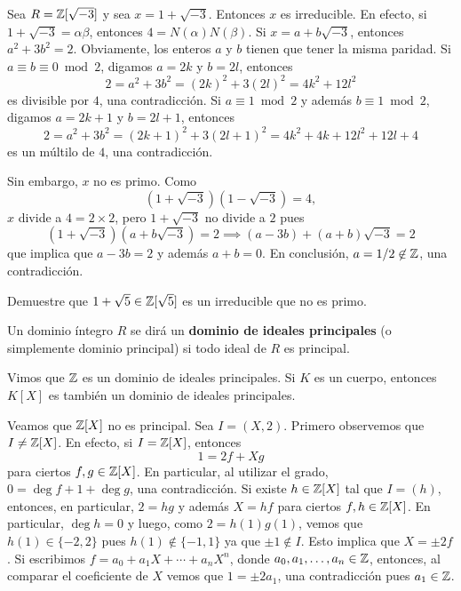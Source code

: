 \begin{example}
Sea $R=\mathbb{Z}[\sqrt{-3}]$ y sea $x=1+\sqrt{-3}$. Entonces $x$ es irreducible. En efecto,
si $1+\sqrt{-3}=\alpha\beta$, entonces $4=N(\alpha)N(\beta)$. Si $x=a+b\sqrt{-3}$, entonces
$a^2+3b^2=2$. Obviamente, los enteros $a$ y $b$ tienen que tener la misma paridad. 
Si $a\equiv b\equiv 0\bmod 2$, digamos $a=2k$ y $b=2l$, entonces
\[
2=a^2+3b^2=(2k)^2+3(2l)^2=4k^2+12l^2
\]
es divisible por $4$, una contradicción. Si $a\equiv 1\bmod 2$ y además $b\equiv 1\bmod 2$, digamos
$a=2k+1$ y $b=2l+1$, entonces
\[
2=a^2+3b^2=(2k+1)^2+3(2l+1)^2=4k^2+4k+12l^2+12l+4
\]
es un múltilo de $4$, una contradicción. 

Sin embargo, $x$ no es primo. Como
\[
(1+\sqrt{-3})(1-\sqrt{-3})=4,
\]
$x$ divide a $4=2\times 2$, pero $1+\sqrt{-3}$ no divide a $2$ pues 
\[
(1+\sqrt{-3})(a+b\sqrt{-3})=2\implies
(a-3b)+(a+b)\sqrt{-3}=2
\]
que implica que $a-3b=2$ y además $a+b=0$. En conclusión, $a=1/2\not\in\mathbb{Z}$, una contradicción. 
\end{example}

\begin{exercise}
Demuestre que $1+\sqrt{5}\in\mathbb{Z}[\sqrt{5}]$ es un irreducible que no es primo.	
\end{exercise}

\begin{definition}
Un dominio íntegro $R$ se dirá un \textbf{dominio de ideales principales} (o simplemente dominio principal) si 
todo ideal de $R$ es principal. 	
\end{definition}

Vimos que $\mathbb{Z}$ es un dominio de ideales principales. Si $K$ es un cuerpo, entonces
$K[X]$ es también un dominio de ideales principales.

\begin{example}
Veamos que $\mathbb{Z}[X]$ no es principal. Sea $I=(X,2)$.
Primero observemos que $I\ne\mathbb{Z}[X]$. En efecto, si $I=\mathbb{Z}[X]$, entonces
\[
1=2f+Xg
\]
para ciertos $f,g\in\mathbb{Z}[X]$. En particular, al utilizar el grado, $0=\deg f+1+\deg g$, una contradicción. 
Si existe $h\in\mathbb{Z}[X]$ tal que $I=(h)$, entonces, en particular, $2=hg$ y además $X=hf$ para ciertos $f,h\in\mathbb{Z}[X]$. 
En particular, $\deg h=0$ y luego, como $2=h(1)g(1)$, vemos que $h(1)\in\{-2,2\}$ pues $h(1)\not\in\{-1,1\}$ ya que $\pm1\not\in I$. 
Esto implica que $X=\pm 2f$. Si escribimos 
$f=a_0+a_1X+\cdots+a_nX^n$, donde $a_0,a_1,\dots,a_n\in\mathbb{Z}$, entonces, al comparar el coeficiente de $X$ vemos que 
$1=\pm 2a_1$, una contradicción pues $a_1\in\mathbb{Z}$. 
\end{example}

